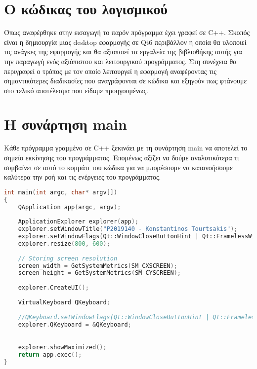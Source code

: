 






\section{Ο κώδικας του λογισμικού}

Όπως αναφέρθηκε στην εισαγωγή το παρόν πρόγραμμα έχει γραφεί σε C++. Σκοπός
είναι η δημιουργία μιας desktop εφαρμογής σε Qt6 περιβάλλον η οποία
θα υλοποιεί τις ανάγκες της εφαρμογής και θα αξιοποιεί τα εργαλεία της βιβλιοθήκης
αυτής για την παραγωγή ενός αξιόπιστου και λειτουργικού προγράμματος. Στη συνέχεια θα περιγραφεί ο τρόπος
με τον οποίο λειτουργεί η εφαρμογή αναφέροντας τις σημαντικότερες διαδικασίες
που αναγράφονται σε κώδικα και εξηγούν πως φτάνουμε στο τελικό αποτέλεσμα
που είδαμε προηγουμένως.


\section{Η συνάρτηση main}
Κάθε πρόγραμμα γραμμένο σε C++ ξεκινάει με τη συνάρτηση main να αποτελεί το
σημείο εκκίνησης του προγράμματος. Επομένως αξίζει να δούμε αναλυτικότερα τι
συμβαίνει σε αυτό το κομμάτι του κώδικα για να μπορέσουμε να κατανοήσουμε
καλύτερα την ροή και τις ενέργειες του προγράμματος.

\begin{lstlisting}[language=C++, style=cppstyle]
int main(int argc, char* argv[]) 
{
    QApplication app(argc, argv);
    
    ApplicationExplorer explorer(app);
    explorer.setWindowTitle("P2019140 - Konstantinos Tourtsakis");
    explorer.setWindowFlags(Qt::WindowCloseButtonHint | Qt::FramelessWindowHint);
    explorer.resize(800, 600);
    
    // Storing screen resolution
    screen_width = GetSystemMetrics(SM_CXSCREEN);
    screen_height = GetSystemMetrics(SM_CYSCREEN);
    
    explorer.CreateUI();
    
    VirtualKeyboard QKeyboard;
    
    //QKeyboard.setWindowFlags(Qt::WindowCloseButtonHint | Qt::FramelessWindowHint);
    explorer.QKeyboard = &QKeyboard;
    

    explorer.showMaximized();
    return app.exec();
}
\end{lstlisting}


